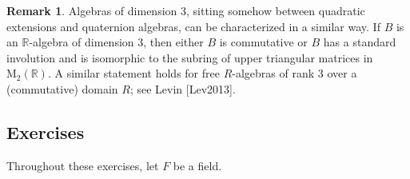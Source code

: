 \documentclass{article}
\theoremstyle{definition}
\newtheorem{remark}[theorem]{Remark}
\begin{document}
\begin{remark}
Algebras of dimension 3, sitting somehow between quadratic extensions and quaternion algebras, can be characterized in a similar way. If $B$ is an $\mathbb{R}$-algebra of dimension 3, then either $B$ is commutative or $B$ has a standard involution and is isomorphic to the subring of upper triangular matrices in $\mathrm{M}_2(\mathbb{R})$. A similar statement holds for free $R$-algebras of rank 3 over a (commutative) domain $R$; see Levin [Lev2013].
\end{remark}

\subsection*{Exercises}

Throughout these exercises, let $F$ be a field.
\end{document}
